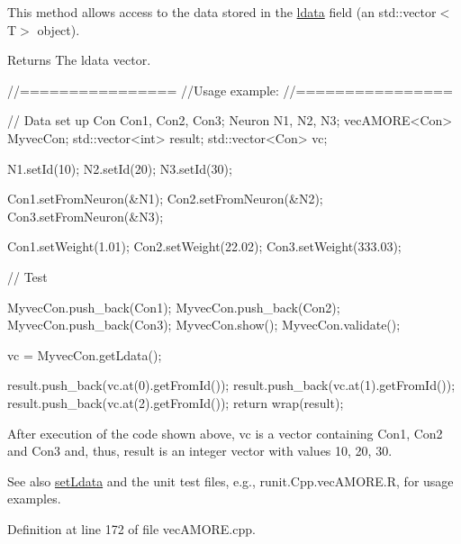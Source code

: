 This method allows access to the data stored in the \hyperlink{classvec_a_m_o_r_e_a1aa2ee42627e14994fed21bc6446993d}{ldata} field (an std::vector$<$T$>$ object). \begin{DoxyReturn}{Returns}
The ldata vector. 
\begin{DoxyCode}
        //================
        //Usage example:
        //================

        // Data set up
                Con Con1, Con2, Con3;
                Neuron N1, N2, N3;
                vecAMORE<Con> MyvecCon;
                std::vector<int> result;
                std::vector<Con> vc;

                N1.setId(10);
                N2.setId(20);
                N3.setId(30);

                Con1.setFromNeuron(&N1);
                Con2.setFromNeuron(&N2);
                Con3.setFromNeuron(&N3);

                Con1.setWeight(1.01);
                Con2.setWeight(22.02);
                Con3.setWeight(333.03);

        // Test

                MyvecCon.push_back(Con1);
                MyvecCon.push_back(Con2);
                MyvecCon.push_back(Con3);
                MyvecCon.show();
                MyvecCon.validate();

                vc = MyvecCon.getLdata();

                result.push_back(vc.at(0).getFromId());
                result.push_back(vc.at(1).getFromId());
                result.push_back(vc.at(2).getFromId());
                return wrap(result);
\end{DoxyCode}

\end{DoxyReturn}
After execution of the code shown above, vc is a vector containing Con1, Con2 and Con3 and, thus, result is an integer vector with values 10, 20, 30.

\begin{DoxySeeAlso}{See also}
\hyperlink{classvec_a_m_o_r_e_ad1594c084d534c3de7acedd714f2e12a}{setLdata} and the unit test files, e.g., runit.Cpp.vecAMORE.R, for usage examples. 
\end{DoxySeeAlso}


Definition at line 172 of file vecAMORE.cpp.



